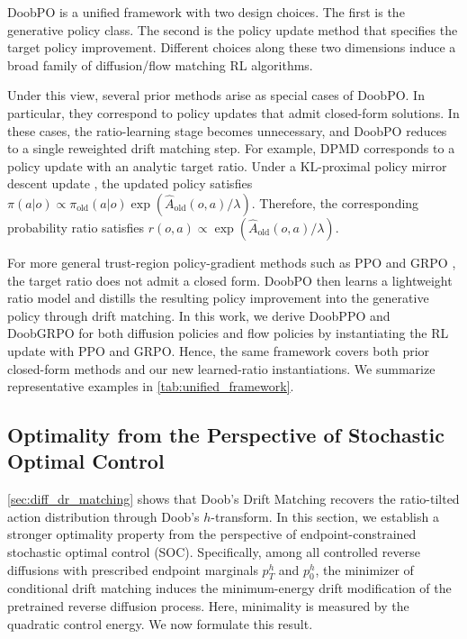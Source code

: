 DoobPO is a unified framework with two design choices.
The first is the generative policy class.
The second is the policy update method that specifies the target policy improvement.
Different choices along these two dimensions induce a broad family of diffusion/flow matching RL algorithms.

Under this view, several prior methods arise as special cases of DoobPO.
In particular, they correspond to policy updates that admit closed-form solutions.
In these cases, the ratio-learning stage becomes unnecessary, and DoobPO reduces to a single reweighted drift matching step.
For example, DPMD \cite{ma2025efficient} corresponds to a policy update with an analytic target ratio.
Under a KL-proximal policy mirror descent update \cite{zhan2023policy}, the updated policy satisfies
$\pi(a|o)\propto \pi_{\mathrm{old}}(a|o)\exp(\hat{A}_{\mathrm{old}}(o,a)/\lambda)$.
Therefore, the corresponding probability ratio satisfies
$r(o,a)\propto \exp(\hat{A}_{\mathrm{old}}(o,a)/\lambda)$.

For more general trust-region policy-gradient methods such as PPO \cite{schulman2017proximal} and GRPO \cite{shao2024deepseekmath}, the target ratio does not admit a closed form.
DoobPO then learns a lightweight ratio model and distills the resulting policy improvement into the generative policy through drift matching.
In this work, we derive DoobPPO and DoobGRPO for both diffusion policies and flow policies by instantiating the RL update with PPO and GRPO.
Hence, the same framework covers both prior closed-form methods and our new learned-ratio instantiations.
We summarize representative examples in \cref{tab:unified_framework}.

\subsection{Optimality from the Perspective of Stochastic Optimal Control}
\label{sec:soc}


\cref{sec:diff_dr_matching} shows that Doob's Drift Matching recovers the ratio-tilted action distribution through Doob's $h$-transform.
In this section, we establish a stronger optimality property from the perspective of endpoint-constrained stochastic optimal control (SOC).
Specifically, among all controlled reverse diffusions
with prescribed endpoint marginals $p_T^h$ and $p_0^h$,
the minimizer of conditional drift matching
induces the minimum-energy drift modification
of the pretrained reverse diffusion process.
Here, minimality is measured by the quadratic control energy.
We now formulate this result.

